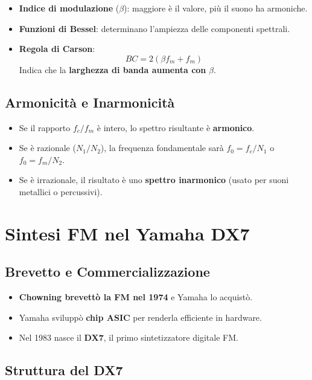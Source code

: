 \begin{itemize}
    \item \textbf{Indice di modulazione} (\( \beta \)): maggiore è il valore, più il suono ha armoniche.
    \item \textbf{Funzioni di Bessel}: determinano l’ampiezza delle componenti spettrali.
    \item \textbf{Regola di Carson}:
    \[
    BC = 2 (\beta f_m + f_m)
    \]
    Indica che la \textbf{larghezza di banda aumenta con} \( \beta \).
\end{itemize}

\subsection*{Armonicità e Inarmonicità}

\begin{itemize}
    \item Se il rapporto \( f_c/f_m \) è intero, lo spettro risultante è \textbf{armonico}.
    \item Se è razionale (\( N_1/N_2 \)), la frequenza fondamentale sarà \( f_0 = f_c / N_1 \) o \( f_0 = f_m / N_2 \).
    \item Se è irrazionale, il risultato è uno \textbf{spettro inarmonico} (usato per suoni metallici o percussivi).
\end{itemize}

\section{Sintesi FM nel Yamaha DX7}

\subsection*{Brevetto e Commercializzazione}

\begin{itemize}
    \item \textbf{Chowning brevettò la FM nel 1974} e Yamaha lo acquistò.
    \item Yamaha sviluppò \textbf{chip ASIC} per renderla efficiente in hardware.
    \item Nel 1983 nasce il \textbf{DX7}, il primo sintetizzatore digitale FM.
\end{itemize}

\subsection*{Struttura del DX7}

